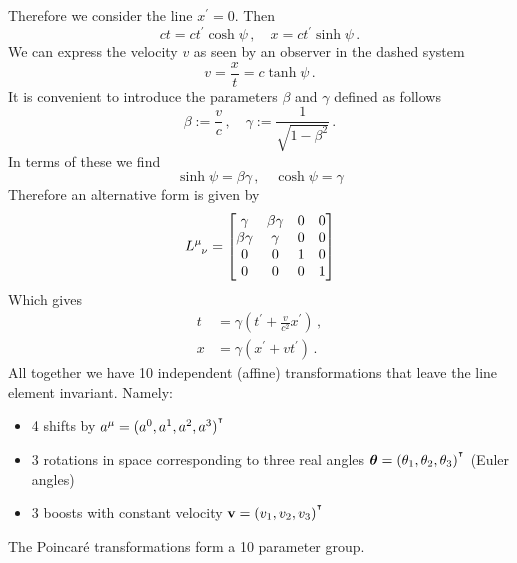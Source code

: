 Therefore we consider the line $x^\prime= 0$.
Then
\begin{equation}
    ct=ct^\prime\cosh\psi\, ,\quad
    x=ct^\prime\sinh\psi\, .
\end{equation}
We can express the velocity $v$ as seen by an observer in the dashed system
\begin{equation}
    v=\frac{x}{t}=c\tanh\psi\,.
\end{equation}
It is convenient to introduce the parameters $\beta$ and $\gamma$ defined as
follows
\begin{equation}
    \beta:=\frac{v}{c}\, ,\quad\gamma:=\frac{1}{\sqrt{1-\beta^2}}\, .
\end{equation}
In terms of these we find
\begin{equation}
    \sinh\psi = \beta\gamma\, , \quad \cosh\psi=\gamma
\end{equation}
Therefore an alternative form is given by
\begin{equation}
    \tensor{L}{^\mu_\nu}=\begin{bmatrix}
\gamma&\beta\gamma & 0&0\\
\beta\gamma&\gamma &0&0\\
0&0&1 &0\\
0&0 &0 &1
\end{bmatrix}
\end{equation}
Which gives
\begin{align}
    t&=\gamma\left(t^\prime+\frac{v}{c^2}x^\prime\right)\, ,\\
    x&=\gamma\left(x^\prime+vt^\prime\right)\, .
\end{align}
All together we have 10 independent (affine) transformations that leave the line
element invariant. Namely:
\begin{itemize}
    \item 4 shifts by $a^\mu=(a^0,a^1,a^2,a^3)^{^\intercal}$
    \item 3 rotations in space corresponding to three real angles
    $\boldsymbol{\theta}=(\theta_1,\theta_2,\theta_3)^{^\intercal}$ (Euler angles)
    \item 3 boosts with constant velocity $\mathbf{v}=(v_1,v_2,v_3)^{^\intercal}$
\end{itemize}
The Poincaré transformations form a 10 parameter group.
